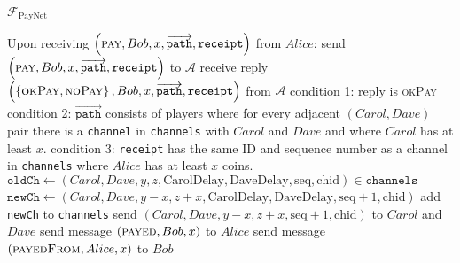 \begin{functionality}{$\mathcal{F}_{\mathrm{PayNet}}$}
\begin{algorithmic}[1]
    \State Upon receiving $\left(\textsc{pay}, Bob, x,
    \overrightarrow{\mathtt{path}}, \mathtt{receipt}\right)$ from $Alice$:
    \Indent
      \State send $\left(\textsc{pay}, Bob, x, \overrightarrow{\mathtt{path}},
      \mathtt{receipt}\right)$ to $\mathcal{A}$
      \State receive reply $\left(\left\{\textsc{okPay}, \textsc{noPay}\right\},
      Bob, x, \overrightarrow{\mathtt{path}}, \mathtt{receipt}\right)$ from
      $\mathcal{A}$
      \State condition 1: reply is \textsc{okPay} 
      \State condition 2: $\overrightarrow{\mathtt{path}}$ consists of players
      where for every adjacent $\left(Carol, Dave\right)$ pair there is a
      \texttt{channel} in \texttt{channels} with $Carol$ and $Dave$ and where
      $Carol$ has at least $x$.
      \State condition 3: \texttt{receipt} has the same ID and sequence number
      as a channel in \texttt{channels} where $Alice$ has at least $x$ coins.
          \State $\mathtt{oldCh} \gets \left(Carol, Dave, y, z,
          \mathrm{CarolDelay}, \mathrm{DaveDelay}, \mathrm{seq},
          \mathrm{chid}\right) \in \mathtt{channels}$
          \State $\mathtt{newCh} \gets \left(Carol, Dave, y - x, z + x,
          \mathrm{CarolDelay}, \mathrm{DaveDelay}, \mathrm{seq} + 1,
          \mathrm{chid}\right)$
          \State add \texttt{newCh} to \texttt{channels}
          \State send $\left(Carol, Dave, y - x, z + x, \mathrm{seq} + 1,
          \mathrm{chid}\right)$ to $Carol$ and $Dave$ 
        \EndFor
        \State send message $\left(\textsc{payed}, Bob, x\right)$ to $Alice$
        \State send message $\left(\textsc{payedFrom}, Alice, x\right)$ to $Bob$
      \EndIf
    \EndIndent
    \State


\end{algorithmic}
\end{functionality}
